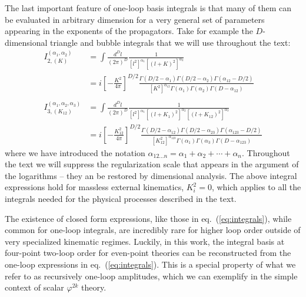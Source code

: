 \documentclass[11pt,letter]{article}
\def\eqn#1{eq.~(\ref{#1})}
\begin{document}
The last important feature of one-loop basis integrals is that many of them can be evaluated in arbitrary dimension for a very general set of parameters appearing in the exponents of the propagators. Take for example the $D$-dimensional triangle and bubble integrals \cite{Smirnov:2004ym} that we will use throughout the text:
\begin{equation}\label{eq:integrals}
{
\begin{aligned}
I_{2,(K)}^{(\alpha_1,\alpha_2)}&=\int \frac{d^{D} l}{(2\pi)^{D}} \frac{1}{[l^2]^{\alpha_1}[(l+K)^2]^{\alpha_2}} 
\\
&=i\left[-\frac{K^2}{4\pi}\right]^{D/2}\frac{\Gamma(D/2-\alpha_1)\Gamma(D/2-\alpha_2)\Gamma(\alpha_{12}-D/2)}{[K^2]^{\alpha_{12}}\Gamma(\alpha_1)\Gamma(\alpha_2)\Gamma(D-\alpha_{12})} 
 \\\\
I_{3,(K_{12})}^{(\alpha_1,\alpha_2,\alpha_3)}&= \int \frac{d^{D} l}{(2\pi)^{D}} \frac{1}{[l^2]^{\alpha_1}[(l+K_1)^2]^{\alpha_2}[(l+K_{12})^2]^{\alpha_3}} 
\\
&=i\left[-\frac{K_{12}^2}{4\pi}\right]^{D/2}\frac{\Gamma(D/2-\alpha_{12})\Gamma(D/2-\alpha_{23})\Gamma(\alpha_{123}-D/2)}{[K_{12}^2]^{\alpha_{123}}\Gamma(\alpha_1)\Gamma(\alpha_3)\Gamma(D-\alpha_{123})} 
\end{aligned}
}
\end{equation}
where we have introduced the notation $\alpha_{12...n} = \alpha_1+\alpha_2+\cdots +\alpha_n$. Throughout the text we will suppress the regularization scale that appears in the argument of the logarithms -- they an be restored by dimensional analysis. The above integral expressions hold for massless external kinematics, $K_i^2=0$, which applies to all the integrals needed for the physical processes described in the text. 

The existence of closed form expressions, like those in \eqn{eq:integrals}, while common for one-loop integrals, are incredibly rare for higher loop order outside of very specialized kinematic regimes. Luckily, in this work, the integral basis at four-point two-loop order for even-point theories can be reconstructed from the one-loop expressions in \eqn{eq:integrals}. This is a special property of what we refer to as recursively one-loop amplitudes, which we can exemplify in the simple context of scalar $\varphi^{2k}$ theory.  
\end{document}
